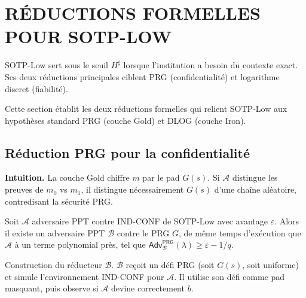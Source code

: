 \section{R\'EDUCTIONS FORMELLES POUR SOTP-LOW}
\label{sec:gamebased_SOTP-Low}
\begin{sloppypar}
SOTP-Low sert sous le seuil $H^\sharp$ lorsque l'institution a besoin du contexte exact.
Ses deux r\'eductions principales ciblent PRG (confidentialit\'e) et
logarithme discret (fiabilit\'e).

Cette section \'etablit les deux r\'eductions formelles qui relient SOTP-Low aux
hypoth\`eses standard PRG (couche Gold) et DLOG (couche Iron).

\subsection{R\'eduction PRG pour la confidentialit\'e}

\noindent\textbf{Intuition.} La couche Gold chiffre $m$ par le pad $G(s)$.
Si $\mathcal{A}$ distingue les preuves de $m_0$ vs $m_1$, il distingue
n\'ecessairement $G(s)$ d'une cha\^ine al\'eatoire, contredisant la s\'ecurit\'e PRG.

\begin{theorem}\label{thm:ann_sotp_low_conf}
Soit $\mathcal{A}$ adversaire PPT contre IND-CONF de SOTP-Low avec
avantage $\varepsilon$. Alors il existe un adversaire PPT $\mathcal{B}$ contre le
PRG $G$, de m\^eme temps d'ex\'ecution que $\mathcal{A}$ \`a un terme polynomial pr\`es,
tel que $\mathsf{Adv}^{\mathsf{PRG}}_{\mathcal{B}}(\lambda) \geq \varepsilon - 1/q$.
\end{theorem}

\begin{Preuve}

\begin{cmtEtape}{Construction du r\'educteur $\mathcal{B}$.}
$\mathcal{B}$ re\c{c}oit un d\'efi PRG (soit $G(s)$, soit uniforme) et
simule l'environnement IND-CONF pour $\mathcal{A}$. Il utilise son
d\'efi comme pad masquant, puis observe si $\mathcal{A}$ devine
correctement $b$.
\end{cmtEtape}


\end{Preuve}
\end{sloppypar}
